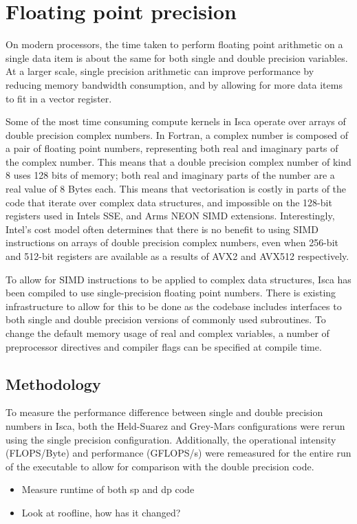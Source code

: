 \documentclass[a4paper,11pt]{report}
\begin{document}
\newpage
\section{Floating point precision}
On modern processors, the time taken to perform floating point arithmetic on a single data item is about the same for both single and double precision variables. At a larger scale, single precision arithmetic can improve performance by reducing memory bandwidth consumption, and by allowing for more data items to fit in a vector register. 
\par
Some of the most time consuming compute kernels in Isca operate over arrays of double precision complex numbers. In Fortran, a complex number is composed of a pair of floating point numbers, representing both real and imaginary parts of the complex number. This means that a double precision complex number of kind 8 uses 128 bits of memory; both real and imaginary parts of the number are a real value of 8 Bytes each. This means that vectorisation is costly in parts of the code that iterate over complex data structures, and impossible on the 128-bit registers used in Intels SSE, and Arms NEON SIMD extensions. Interestingly, Intel's cost model often determines that there is no benefit to using SIMD instructions on arrays of double precision complex numbers, even when 256-bit and 512-bit registers are available as a results of AVX2 and AVX512 respectively.
\par
To allow for SIMD instructions to be applied to complex data structures, Isca has been compiled to use single-precision floating point numbers. There is existing infrastructure to allow for this to be done as the codebase includes interfaces to both single and double precision versions of commonly used subroutines. To change the default memory usage of real and complex variables, a number of preprocessor directives and compiler flags can be specified at compile time. 

\subsection{Methodology}
To measure the performance difference between single and double precision numbers in Isca, both the Held-Suarez and Grey-Mars configurations were rerun using the single precision configuration. Additionally, the operational intensity (FLOPS/Byte) and performance (GFLOPS/s) were remeasured for the entire run of the executable to allow for comparison with the double precision code. 
\begin{itemize}
	\item Measure runtime of both sp and dp code
	\item Look at roofline, how has it changed? 
\end{itemize}
\end{document}
